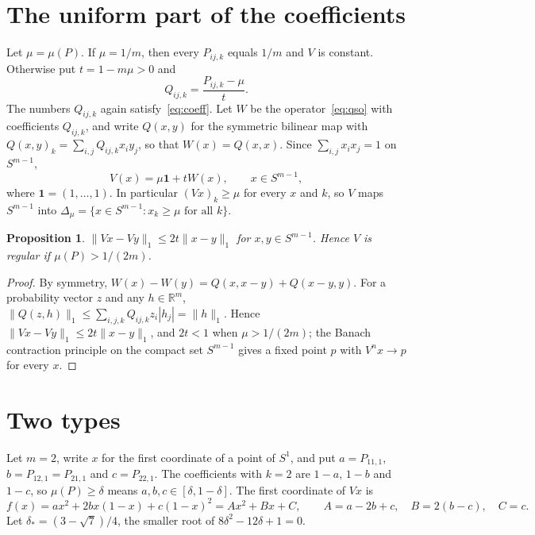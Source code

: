 \documentclass[11pt]{amsart}
\newtheorem{proposition}[theorem]{Proposition}
\theoremstyle{definition}
\theoremstyle{remark}
\newcommand{\R}{\mathbb{R}}
\newcommand{\one}{\mathbf{1}}
\begin{document}
\section{The uniform part of the coefficients}\label{sec:prelim}

Let $\mu=\mu(P)$. If $\mu=1/m$, then every $P_{ij,k}$ equals $1/m$ and $V$ is constant. Otherwise put $t=1-m\mu>0$ and
\[
Q_{ij,k}=\frac{P_{ij,k}-\mu}{t}.
\]
The numbers $Q_{ij,k}$ again satisfy~\eqref{eq:coeff}. Let $W$ be the operator~\eqref{eq:qso} with coefficients
$Q_{ij,k}$, and write $Q(x,y)$ for the symmetric bilinear map with $Q(x,y)_k=\sum_{i,j}Q_{ij,k}x_iy_j$, so that
$W(x)=Q(x,x)$. Since $\sum_{i,j}x_ix_j=1$ on $S^{m-1}$,
\begin{equation}\label{eq:split}
V(x)=\mu\one+tW(x),\qquad x\in S^{m-1},
\end{equation}
where $\one=(1,\dots,1)$. In particular $(Vx)_k\ge\mu$ for every $x$ and $k$, so $V$ maps $S^{m-1}$ into
$\Delta_\mu=\{x\in S^{m-1}:x_k\ge\mu\text{ for all }k\}$.

\begin{proposition}\label{prop:l1}
$\|Vx-Vy\|_1\le2t\|x-y\|_1$ for $x,y\in S^{m-1}$. Hence $V$ is regular if $\mu(P)>1/(2m)$.
\end{proposition}

\begin{proof}
By symmetry, $W(x)-W(y)=Q(x,x-y)+Q(x-y,y)$. For a probability vector $z$ and any $h\in\R^m$,
$\|Q(z,h)\|_1\le\sum_{i,j,k}Q_{ij,k}z_i|h_j|=\|h\|_1$. Hence $\|Vx-Vy\|_1\le2t\|x-y\|_1$, and $2t<1$ when
$\mu>1/(2m)$; the Banach contraction principle on the compact set $S^{m-1}$ gives a fixed point $p$ with $V^nx\to p$ for
every $x$.
\end{proof}

\section{Two types}\label{sec:binary}

Let $m=2$, write $x$ for the first coordinate of a point of $S^1$, and put $a=P_{11,1}$, $b=P_{12,1}=P_{21,1}$ and
$c=P_{22,1}$. The coefficients with $k=2$ are $1-a$, $1-b$ and $1-c$, so $\mu(P)\ge\delta$ means
$a,b,c\in[\delta,1-\delta]$. The first coordinate of $Vx$ is
\begin{equation}\label{eq:f}
f(x)=ax^2+2bx(1-x)+c(1-x)^2=Ax^2+Bx+C,\qquad A=a-2b+c,\quad B=2(b-c),\quad C=c .
\end{equation}
Let $\delta_*=(3-\sqrt7)/4$, the smaller root of $8\delta^2-12\delta+1=0$.
\end{document}
